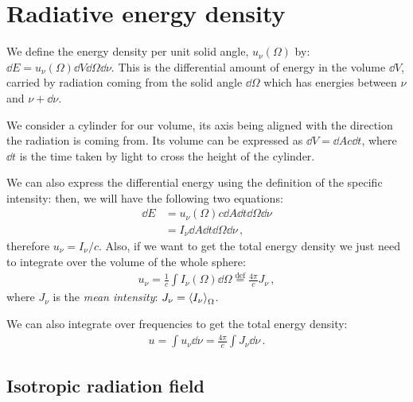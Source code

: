 \documentclass[main.tex]{subfiles}
\begin{document}

\section{Radiative energy density}

We define the energy density per unit solid angle, \(u_{\nu }(\Omega )\) by: \(\dd{E} = u_{\nu } (\Omega ) \dd{V} \dd{\Omega } \dd{\nu }\).
This is the differential amount of energy in the volume \(\dd{V}\), carried by radiation coming from the solid angle \(\dd{\Omega }\) which has energies between  \(\nu \) and \(\nu + \dd{\nu }\). 

We consider a cylinder for our volume, its axis being aligned with the direction the radiation is coming from. 
Its volume can be expressed as \(\dd{V} =\dd{A} c \dd{t}\), where \(\dd{t}\) is the time taken by light to cross the height of the cylinder.

We can also express the differential energy using the definition of the specific intensity: then, we will have the following two equations: 
%
\begin{align}
\dd{E} &= u_{\nu } (\Omega ) c \dd{A} \dd{t} \dd{\Omega } \dd{\nu }  \\
&= I_{\nu } \dd{A} \dd{t} \dd{\Omega } \dd{\nu }
\,,
\end{align}
%
therefore \(u_{\nu } = I_{ \nu } / c\).
Also, if we want to get the total energy density we just need to integrate over the volume of the whole sphere: 
%
\begin{align}
u_{\nu } = \frac{1}{c} \int I_{\nu }  (\Omega ) \dd{\Omega }
\overset{\text{def}}{=} \frac{4 \pi }{c} J_{\nu }
\,,
\end{align}
%
where \(J_{\nu  }\) is the \emph{mean intensity}: \(J_{\nu } = \expval{I_{\nu }}_{\Omega }\). 

We can also integrate over frequencies to get the total energy density: 
%
\begin{align}
u = \int u_{\nu } \dd{\nu } = \frac{4 \pi }{c} \int J_{\nu } \dd{\nu }
\,.
\end{align}

\subsection{Isotropic radiation field}
\end{document}

